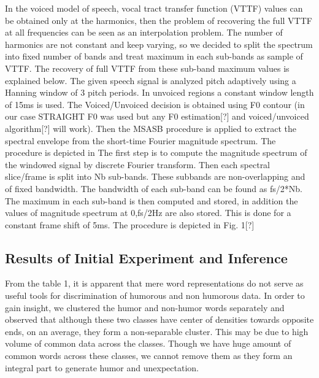 \documentclass{acm_proc_article-sp}
\begin{document}
 In the voiced model of speech, vocal tract transfer function (VTTF) values can be obtained only at the harmonics, then the problem of recovering the full VTTF at all frequencies can be seen as an interpolation problem. The number of harmonics are not constant and keep varying, so we decided to split the spectrum into fixed number of bands and treat maximum in each sub-bands as sample of VTTF. The recovery of full VTTF from these sub-band maximum values is explained below.
   The given speech signal is analyzed pitch adaptively using a Hanning window of 3 pitch periods. In unvoiced regions a constant window length of 15ms is used. The Voiced/Unvoiced decision is obtained using F0 contour (in our case STRAIGHT F0 was used but any F0 estimation[?] and voiced/unvoiced algorithm[?]  will work). Then the MSASB procedure is applied to extract the spectral envelope from the short-time Fourier magnitude spectrum. The procedure is depicted in  The first step is to compute the magnitude spectrum of the windowed signal by discrete Fourier transform. Then each spectral slice/frame is split into Nb
sub-bands. These subbands are non-overlapping and of fixed bandwidth. The bandwidth of each sub-band can be found as fs/2*Nb. The maximum in each sub-band is then computed and stored, in addition the values of magnitude spectrum at 0,fs/2Hz are also stored. This is done for a constant frame shift of 5ms. The procedure is depicted in Fig. 1[?]




\subsection{ Results of Initial Experiment and Inference}

From the table 1, it is apparent that mere word representations do not serve as useful tools for discrimination of humorous and non humorous data.
In order to gain insight, we clustered the humor and non-humor words separately and observed that although these two classes have center of densities towards opposite ends, on an average, they form a non-separable cluster. 
This may be due to high volume of common data across the classes. Though we have huge amount of common words across these classes, we cannot remove them as they form an integral part to generate humor and unexpectation.
\end{document}
